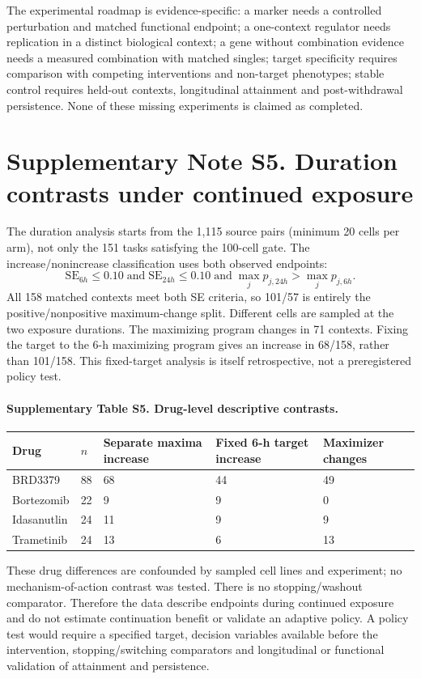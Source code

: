 \documentclass[a4paper,fleqn]{cas-sc}
\makeatletter
\DeclareRobustCommand{\rev}[1]{{\color{red}\def\@citecolor{black}\def\@linkcolor{red}\def\@urlcolor{red}#1}}
\makeatother
\begin{document}
The experimental roadmap is evidence-specific: a marker needs a controlled perturbation and matched functional endpoint; a one-context regulator needs replication in a distinct biological context; a gene without combination evidence needs a measured combination with matched singles; target specificity requires comparison with competing interventions and non-target phenotypes; stable control requires held-out contexts, longitudinal attainment and post-withdrawal persistence. None of these missing experiments is claimed as completed.

\section*{Supplementary Note S5. Duration contrasts under continued exposure}

The duration analysis starts from the 1,115 source pairs (minimum 20 cells per arm), not only the 151 tasks satisfying the 100-cell gate. \rev{The increase/nonincrease classification uses both observed endpoints:
{}
{\color{red}
\[
\mathrm{SE}_{6h}\leq0.10\;\text{and}\;\mathrm{SE}_{24h}\leq0.10\;\text{and}\;\max_j p_{j,24h}>\max_j p_{j,6h}.
\]
}
\rev{}
All 158 matched contexts meet both SE criteria, so 101/57 is entirely the positive/nonpositive maximum-change split. Different cells are sampled at the two exposure durations. The maximizing program changes in 71 contexts. Fixing the target to the 6-h maximizing program gives an increase in 68/158, rather than 101/158. This fixed-target analysis is itself retrospective, not a preregistered policy test.}

\paragraph{Supplementary Table S5. Drug-level descriptive contrasts.}
\begin{longtable}{p{}p{}p{}p{}p{}}
\toprule
\rev{Drug} & \rev{$n$} & \rev{Separate maxima increase} & \rev{Fixed 6-h target increase} & \rev{Maximizer changes}\\
\midrule
\endhead
\rev{BRD3379} & \rev{88} & \rev{68} & \rev{44} & \rev{49}\\
\rev{Bortezomib} & \rev{22} & \rev{9} & \rev{9} & \rev{0}\\
\rev{Idasanutlin} & \rev{24} & \rev{11} & \rev{9} & \rev{9}\\
\rev{Trametinib} & \rev{24} & \rev{13} & \rev{6} & \rev{13}\\
\bottomrule
\end{longtable}
These drug differences are confounded by sampled cell lines and experiment; no mechanism-of-action contrast was tested. There is no stopping/washout comparator. Therefore the data describe endpoints during continued exposure and do not estimate continuation benefit or validate an adaptive policy. A policy test would require a specified target, decision variables available before the intervention, stopping/switching comparators and longitudinal or functional validation of attainment and persistence.
\end{document}
